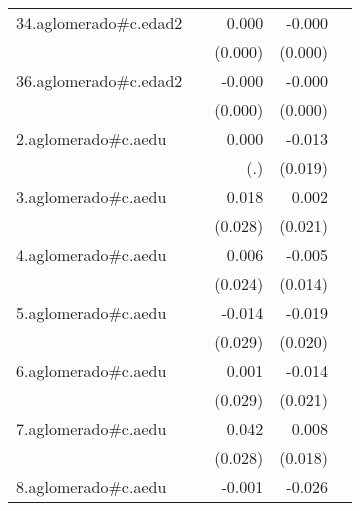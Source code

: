 {\begin{longtable}{l*{4}{D{.}{.}{-1}}}
\addlinespace
34.aglomerado#c.edad2&                     &       0.000         &      -0.000         &                     \\
            &                     &     (0.000)         &     (0.000)         &                     \\
\addlinespace
36.aglomerado#c.edad2&                     &      -0.000         &      -0.000\sym{*}  &                     \\
            &                     &     (0.000)         &     (0.000)         &                     \\
\addlinespace
2.aglomerado#c.aedu&                     &       0.000         &      -0.013         &                     \\
            &                     &         (.)         &     (0.019)         &                     \\
\addlinespace
3.aglomerado#c.aedu&                     &       0.018         &       0.002         &                     \\
            &                     &     (0.028)         &     (0.021)         &                     \\
\addlinespace
4.aglomerado#c.aedu&                     &       0.006         &      -0.005         &                     \\
            &                     &     (0.024)         &     (0.014)         &                     \\
\addlinespace
5.aglomerado#c.aedu&                     &      -0.014         &      -0.019         &                     \\
            &                     &     (0.029)         &     (0.020)         &                     \\
\addlinespace
6.aglomerado#c.aedu&                     &       0.001         &      -0.014         &                     \\
            &                     &     (0.029)         &     (0.021)         &                     \\
\addlinespace
7.aglomerado#c.aedu&                     &       0.042         &       0.008         &                     \\
            &                     &     (0.028)         &     (0.018)         &                     \\
\addlinespace
8.aglomerado#c.aedu&                     &      -0.001         &      -0.026         &                     \\

\end{longtable}}
